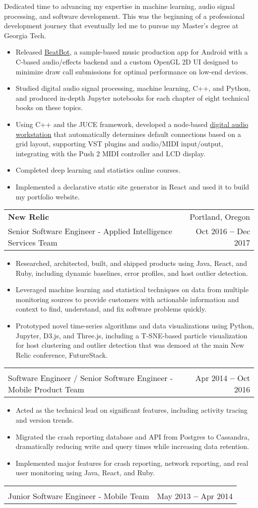 \documentclass[letterpaper,11pt]{article}
\makeatletter
\newcommand{\resumeItem}[1]{
  \item\small{
    {#1 \vspace{-2pt}}
  }
}
\newcommand{\resumeSubheading}[4]{
  \item
    \begin{tabular*}{0.97\textwidth}[t]{l@{\extracolsep{\fill}}r}
      \normalsize \textbf{#1} & \small#2 \\
      \small #3 & \small #4 \\
    \end{tabular*}\vspace{-9pt}
}
\newcommand{\resumeItemListStart}{\begin{itemize}}
\newcommand{\resumeItemListEnd}{\end{itemize}\vspace{-5pt}}
\newcommand{\resumeSectionBody}[1]{
  \vspace{0.7em}
  \small #1
  \vspace{-5pt}
}
\makeatother
\begin{document}
      \resumeSectionBody{
        Dedicated time to advancing my expertise in machine learning, audio signal processing, and software development.
        This was the beginning of a professional development journey that eventually led me to pursue my Master's degree at Georgia Tech.
      }
      \resumeItemListStart
        \resumeItem{Released \href{https://karlhiner.com/beatbot}{BeatBot}, a sample-based music production app for Android with a C-based audio/effects backend and a custom OpenGL 2D UI designed to minimize draw call submissions for optimal performance on low-end devices.}
        \resumeItem{Studied digital audio signal processing, machine learning, C++, and Python, and produced in-depth Jupyter notebooks for each chapter of eight technical books on these topics.}
        \resumeItem{Using C++ and the JUCE framework, developed a node-based \href{https://github.com/khiner/flowgrid_old}{digital audio workstation} that automatically determines default connections based on a grid layout, supporting VST plugins and audio/MIDI input/output, integrating with the Push 2 MIDI controller and LCD display.}
        \resumeItem{Completed deep learning and statistics online courses.}
        \resumeItem{Implemented a declarative static site generator in React and used it to build my portfolio website.}
      \resumeItemListEnd
    \newpage
    \resumeSubheading
      {New Relic}{Portland, Oregon}
      {Senior Software Engineer - Applied Intelligence Services Team}{Oct 2016 \textbf{--} Dec 2017}

        \resumeItemListStart
          \resumeItem{Researched, architected, built, and shipped products using Java, React, and Ruby, including dynamic baselines, error profiles, and host outlier detection.}
          \resumeItem{Leveraged machine learning and statistical techniques on data from multiple monitoring sources to provide customers with actionable information and context to find, understand, and fix software problems quickly.}
          \resumeItem{Prototyped novel time-series algorithms and data visualizations using Python, Jupyter, D3.js, and Three.js, including a T-SNE-based particle visualization for host clustering and outlier detection that was demoed at the main New Relic conference, FutureStack.}
        \resumeItemListEnd
        \vspace{-15pt}
    \resumeSubheading
      {}{}
      {Software Engineer / Senior Software Engineer - Mobile Product Team}{Apr 2014 \textbf{--} Oct 2016}
        \resumeItemListStart
        \resumeItem{Acted as the technical lead on significant features, including activity tracing and version trends.}
        \resumeItem{Migrated the crash reporting database and API from Postgres to Cassandra, dramatically reducing write and query times while increasing data retention.}
        \resumeItem{Implemented major features for crash reporting, network reporting, and real user monitoring using Java, React, and Ruby.}
        \resumeItemListEnd
        \vspace{-15pt}
    \resumeSubheading
      {}{}
      {Junior Software Engineer - Mobile Team}{May 2013 \textbf{--} Apr 2014}
\end{document}
